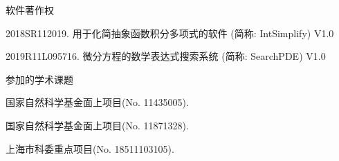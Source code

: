 \noindent 软件著作权
\begin{enumerate}[label={[\arabic*]},leftmargin=*]
\item 2018SR112019. 用于化简抽象函数积分多项式的软件 (简称: IntSimplify) V1.0
\item 2019R11L095716. 微分方程的数学表达式搜索系统 (简称: SearchPDE) V1.0
\end{enumerate}

\noindent 参加的学术课题
\begin{enumerate}[label={[\arabic*]},leftmargin=*]
\item 国家自然科学基金面上项目(No. 11435005).
\item 国家自然科学基金面上项目(No. 11871328).
\item 上海市科委重点项目(No. 18511103105). 
\end{enumerate}
\fi
